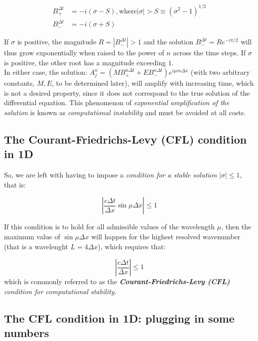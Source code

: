 	
	
	\begin{align}
		B_{+}^{\Delta t}  &= -i \left ( \sigma -S \right)  \mathrm{,where } | \sigma| > S \equiv \left(  \sigma^2 - 1 \right)^{1/2} \nonumber \\
		B_{-}^{\Delta t}  &= -i \left ( \sigma +S \right)  \nonumber
		\label{adv-CTCS-1D-unstable-solution}
	\end{align}
	
	If $\sigma$ is positive, the magnitude $R=|B_{-}^{\Delta t}| > 1$ and the solution $ B_{-}^{\Delta t} = R e^{-i \pi /2 }$ will thus grow exponentially when raised to the power of $n$ across the time steps. If $\sigma$ is positive, the other root has a magnitude exceeding $1$. \\
	In either case, the solution: $A_j^{n} = \left( M B_{+}^{n \Delta t}+ E B_{-}^{n \Delta t} \right)e^{i \mu m \Delta x}$  (with two arbitrary constants, $M,E$, to be determined later), will amplify with increasing time, which is not a desired property, since it does not correspond to the true solution of the differential equation. This phenomenon of \emph{exponential amplification of the solution} is known as \emph{computational instability} and must be avoided at all costs. 
	
\subsection{The Courant-Friedrichs-Levy (CFL) condition in 1D}

	So, we are left with having to impose a \emph{condition for a stable solution} $|\sigma| \leq 1$, that is:
	
	\begin{equation}
		\left | \frac {c \Delta t}{\Delta x} \sin \mu \Delta x \right | \leq 1
	\end{equation}	
	
	If this condition is to hold for all admissible values of the wavelength $\mu$, then the maximum value of $\sin \mu \Delta x$ will happen for the highest resolved wavenumber (that is a wavelenght $L=4 \Delta x$), which requires that:
	
	\begin{equation}
		\left | \frac {c \Delta t}{\Delta x}  \right | \leq 1
	\end{equation}	
	which is commonly referred to as the \emph{\textbf{Courant-Friedrichs-Levy (CFL)} condition for computational stability}.


\subsection{The CFL condition in 1D: plugging in some numbers}


